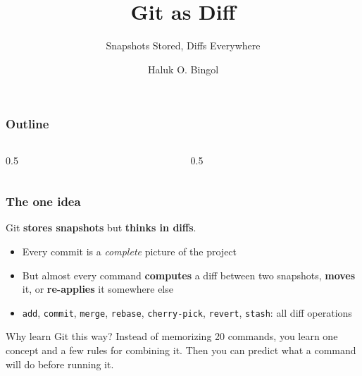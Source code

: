 \documentclass[aspectratio=169,10pt,compress]{beamer}
\title{Git as Diff}
\subtitle{Snapshots Stored, Diffs Everywhere}
\author[Bingol]{Haluk O. Bingol}
\institute[FCIS]{
    Faculty of Computer and Information Sciences\\
    Yeditepe University
}
\date{}
\newcommand{\cmd}[1]{\texttt{\color{gitred}#1}}
\begin{document}
\begin{frame}[t,fragile]
  \titlepage
\end{frame}

\begin{frame}[t,fragile] \frametitle{Outline}
  \begin{columns}[T]
    \begin{column}{0.5\textwidth}
      \tableofcontents[sections={1-4}]
    \end{column}
    \begin{column}{0.5\textwidth}
      \tableofcontents[sections={5-8}]
    \end{column}
  \end{columns}
\end{frame}

\begin{frame}[t,fragile] \frametitle{The one idea}
  \vspace{1em}
  \begin{center}
    \Large Git \textbf{stores snapshots} but \textbf{thinks in diffs}.
  \end{center}
  \vspace{1em}

  \begin{itemize}
    \item Every commit is a \emph{complete} picture of the project
    \item But almost every command \textbf{computes} a diff between two snapshots,
          \textbf{moves} it, or \textbf{re-applies} it somewhere else
    \item \cmd{add}, \cmd{commit}, \cmd{merge}, \cmd{rebase}, \cmd{cherry-pick},
          \cmd{revert}, \cmd{stash}: all diff operations
  \end{itemize}

  \vspace{1em}
  \begin{block}{Why learn Git this way?}
    Instead of memorizing 20 commands, you learn one concept and a few rules for combining it.
    Then you can predict what a command will do before running it.
  \end{block}
\end{frame}

\end{document}
